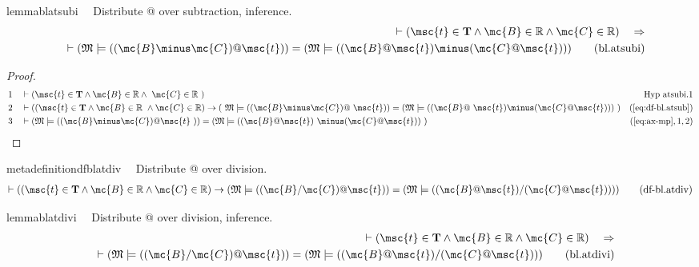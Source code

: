\begin{restatable}{lemma}{blatsubi}~~ Distribute @ over subtraction, inference.
\begin{align}
\vdash ( \msc{t} \in \mathbf{T} \wedge \mc{B} \in \mathbb{R} \wedge \mc{C} \in
    \mathbb{R} )\quad\Rightarrow \notag \\ 
	\quad \vdash ( \mathfrak{M} \models ( ( \mc{B}
    \minus \mc{C} ) @ \msc{t} ) ) = ( \mathfrak{M} \models ( ( \mc{B} @ \msc{t}
    ) \minus ( \mc{C} @ \msc{t} ) ) )\label{eq:bl.atsubi}\tag{bl.atsubi}
\end{align}
\end{restatable}

\begin{proof}
\begin{align}
  1 &&  & \vdash ( \msc{t} \in \mathbf{T} \wedge \mc{B} \in \mathbb{R} \wedge
     ~\mc{C} \in \mathbb{R}
     ~)&\text{Hyp~atsubi.1}\notag%
  \\ 2 &&  & \vdash ( ( \msc{t} \in \mathbf{T} \wedge \mc{B} \in \mathbb{R}
     ~\wedge \mc{C} \in \mathbb{R} ) \rightarrow (
     ~\mathfrak{M} \models ( ( \mc{B} \minus \mc{C} ) @
     ~\msc{t} ) ) = ( \mathfrak{M} \models ( ( \mc{B} @
     ~\msc{t} ) \minus ( \mc{C} @ \msc{t} ) ) )
     ~)&(\mbox{\ref{eq:df-bl.atsub}})\notag
  \\ 3 &&  & \vdash ( \mathfrak{M} \models ( ( \mc{B} \minus \mc{C} ) @ \msc{t}
     ~) ) = ( \mathfrak{M} \models ( ( \mc{B} @ \msc{t} )
     ~\minus ( \mc{C} @ \msc{t} ) )
     ~)&(\mbox{\ref{eq:ax-mp}},1,2)\notag
\end{align}
\end{proof}

\begin{restatable}{metadefinition}{dfblatdiv}~~ Distribute @ over division.
\begin{align}
\vdash ( ( \msc{t} \in \mathbf{T} \wedge \mc{B} \in \mathbb{R} \wedge \mc{C}
    \in \mathbb{R} ) \rightarrow ( \mathfrak{M} \models ( ( \mc{B} / \mc{C} ) @
    \msc{t} ) ) = ( \mathfrak{M} \models ( ( \mc{B} @ \msc{t} ) / ( \mc{C} @
    \msc{t} ) ) ) )\label{eq:df-bl.atdiv}\tag{df-bl.atdiv}
\end{align}
\end{restatable}

\begin{restatable}{lemma}{blatdivi}~~ Distribute @ over division, inference.
\begin{align}
\vdash ( \msc{t} \in \mathbf{T} \wedge \mc{B} \in \mathbb{R} \wedge \mc{C} \in
    \mathbb{R} )\quad\Rightarrow \notag \\ 
	\quad \vdash ( \mathfrak{M} \models ( ( \mc{B}
    / \mc{C} ) @ \msc{t} ) ) = ( \mathfrak{M} \models ( ( \mc{B} @ \msc{t} ) /
    ( \mc{C} @ \msc{t} ) ) )\label{eq:bl.atdivi}\tag{bl.atdivi}
\end{align}
\end{restatable}


